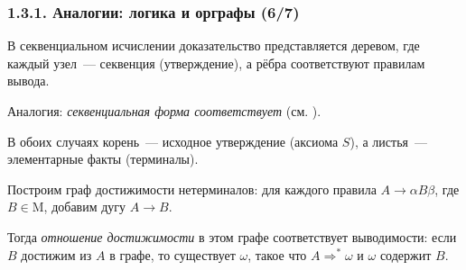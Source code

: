 \begin{frame}
\frametitle{1.3.1. Аналогии: логика и орграфы (6/7)}

\begin{digress}
В секвенциальном исчислении доказательство 
представляется деревом, где каждый узел~--- секвенция (утверждение), 
а рёбра соответствуют правилам вывода.

Аналогия: \emph{секвенциальная форма соответствует } 
(см. ).

В обоих случаях корень~--- исходное утверждение (аксиома $S$), 
а листья~--- элементарные факты (терминалы).
\end{digress}

\begin{digress}
Построим граф достижимости нетерминалов: 
для каждого правила $A \to \alpha B \beta$, где $B \in \mathrm{M}$, 
добавим дугу $A \to B$.

Тогда \emph{отношение достижимости} в этом графе соответствует выводимости:
если $B$ достижим из $A$ в графе, то существует $\omega$, такое что 
$A \Rightarrow^* \omega$ и $\omega$ содержит $B$.
\end{digress}

\bigskip
{}

\end{frame}



